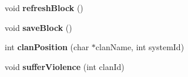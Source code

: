 \begin{DoxyCompactItemize}
\item 
\hypertarget{classBlock_ad852050bf8d0b0a45606c7c81eff5e01}{void {\bfseries refresh\-Block} ()}\label{classBlock_ad852050bf8d0b0a45606c7c81eff5e01}

\item 
\hypertarget{classBlock_a76ab5cc26d168222de57266857087f3f}{void {\bfseries save\-Block} ()}\label{classBlock_a76ab5cc26d168222de57266857087f3f}

\item 
\hypertarget{classBlock_ad4f51b15f69ffe16d79a37eba197f487}{int {\bfseries clan\-Position} (char $\ast$clan\-Name, int system\-Id)}\label{classBlock_ad4f51b15f69ffe16d79a37eba197f487}

\item 
\hypertarget{classBlock_ae1b293eaf069756ceb86282c7d3a3715}{void {\bfseries suffer\-Violence} (int clan\-Id)}\label{classBlock_ae1b293eaf069756ceb86282c7d3a3715}

\end{DoxyCompactItemize}

